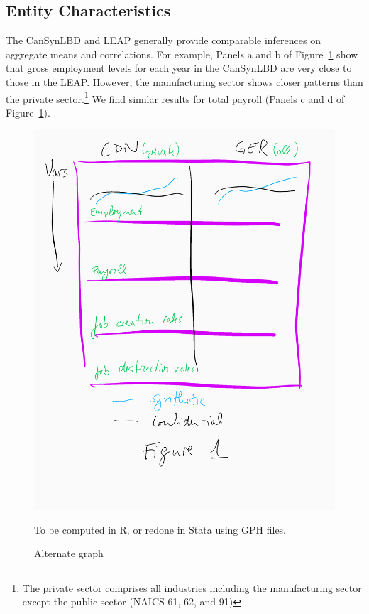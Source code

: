 
\newcommand{\CanTableNote}{$LEAP$ is the Longitudinal Employment Analysis Program and $CanSynLBD$ is the Canadian synthetic database based on LEAP. }

\subsection{Entity Characteristics}

The CanSynLBD and LEAP generally provide comparable inferences on aggregate means and correlations. For example, 
Panels a and b of Figure~\ref{tab:all:characteristics}
show that gross employment levels for each year in the CanSynLBD are very close to those in the LEAP. However, the manufacturing sector shows closer patterns than the private sector.\footnote{The private sector comprises all industries including the manufacturing sector except the public sector  (NAICS 61, 62, and 91)} We find similar results for total payroll (Panels c and d of Figure~\ref{tab:all:characteristics}).

\begin{figure} [H]
\centering
\label{tab:all:characteristics}
\includegraphics[width=.8\linewidth]{graphs/Figure1-placeholder.png} 
\caption{Alternate graph} 
\begin{minipage}{0.48\linewidth}
{\footnotesize To be computed in R, or redone in Stata using GPH files. \par}
\end{minipage}
\end{figure}


